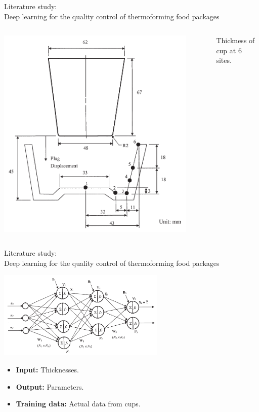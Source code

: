 \documentclass{beamer}
\begin{document}
	\begin{frame}{Literature study:\\Deep learning for the quality control of thermoforming food packages}
		\begin{columns}
			\begin{column}{0.5\textwidth}
				\begin{center}
					\includegraphics[width=0.9\textwidth]{Figures/CupDimensions.pdf}
				\end{center}
			\end{column}
			\begin{column}{0.5\textwidth}  %
				Thickness of cup at 6 sites.
			\end{column}
		\end{columns}
	\end{frame}

	\begin{frame}{Literature study:\\Deep learning for the quality control of thermoforming food packages}
		\begin{center}
			\includegraphics[width=0.6\textwidth]{Figures/NeuralNet.pdf}
		\end{center}
		\begin{itemize}
			\item \textbf{Input:} Thicknesses.
			\item \textbf{Output:} Parameters.
			\item \textbf{Training data:} Actual data from cups.
		\end{itemize}
	\end{frame}
\end{document}
